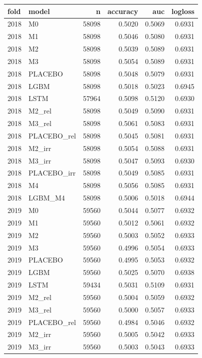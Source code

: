 \begin{tabular}{llrrrr}
\toprule
fold & model & n & accuracy & auc & logloss \\
\midrule
2018 & M0 & 58098 & 0.5020 & 0.5069 & 0.6931 \\
2018 & M1 & 58098 & 0.5046 & 0.5080 & 0.6931 \\
2018 & M2 & 58098 & 0.5039 & 0.5089 & 0.6931 \\
2018 & M3 & 58098 & 0.5054 & 0.5089 & 0.6931 \\
2018 & PLACEBO & 58098 & 0.5048 & 0.5079 & 0.6931 \\
2018 & LGBM & 58098 & 0.5018 & 0.5023 & 0.6945 \\
2018 & LSTM & 57964 & 0.5098 & 0.5120 & 0.6930 \\
2018 & M2\_rel & 58098 & 0.5049 & 0.5090 & 0.6931 \\
2018 & M3\_rel & 58098 & 0.5061 & 0.5083 & 0.6931 \\
2018 & PLACEBO\_rel & 58098 & 0.5045 & 0.5081 & 0.6931 \\
2018 & M2\_irr & 58098 & 0.5054 & 0.5088 & 0.6931 \\
2018 & M3\_irr & 58098 & 0.5047 & 0.5093 & 0.6930 \\
2018 & PLACEBO\_irr & 58098 & 0.5049 & 0.5085 & 0.6931 \\
2018 & M4 & 58098 & 0.5056 & 0.5085 & 0.6931 \\
2018 & LGBM\_M4 & 58098 & 0.5006 & 0.5018 & 0.6944 \\
2019 & M0 & 59560 & 0.5044 & 0.5077 & 0.6932 \\
2019 & M1 & 59560 & 0.5012 & 0.5061 & 0.6932 \\
2019 & M2 & 59560 & 0.5003 & 0.5052 & 0.6933 \\
2019 & M3 & 59560 & 0.4996 & 0.5054 & 0.6933 \\
2019 & PLACEBO & 59560 & 0.4995 & 0.5053 & 0.6932 \\
2019 & LGBM & 59560 & 0.5025 & 0.5070 & 0.6938 \\
2019 & LSTM & 59434 & 0.5031 & 0.5109 & 0.6931 \\
2019 & M2\_rel & 59560 & 0.5004 & 0.5059 & 0.6932 \\
2019 & M3\_rel & 59560 & 0.5000 & 0.5057 & 0.6933 \\
2019 & PLACEBO\_rel & 59560 & 0.4984 & 0.5046 & 0.6932 \\
2019 & M2\_irr & 59560 & 0.5005 & 0.5042 & 0.6933 \\
2019 & M3\_irr & 59560 & 0.5003 & 0.5043 & 0.6933 \\

\end{tabular}
